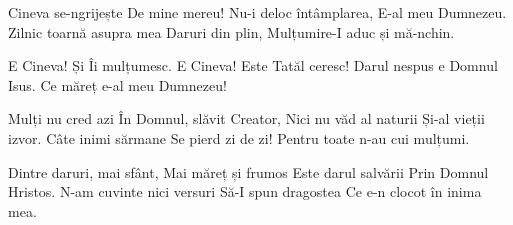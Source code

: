 \beginverse
Cineva se-ngrijește
De mine mereu!
Nu-i deloc întâmplarea,
E-al meu Dumnezeu.
Zilnic toarnă asupra mea
Daruri din plin,
Mulțumire-I aduc și mă-nchin.
\endverse

\beginchorus
E Cineva! Și Îi mulțumesc.
E Cineva! Este Tatăl ceresc!
Darul nespus e Domnul Isus.
Ce măreț e-al meu Dumnezeu!
\endchorus

\beginverse
Mulți nu cred azi
În Domnul, slăvit Creator,
Nici nu văd al naturii
Și-al vieții izvor.
Câte inimi sărmane
Se pierd zi de zi!
Pentru toate n-au cui mulțumi.
\endverse

\beginverse
Dintre daruri, mai sfânt,
Mai măreț și frumos
Este darul salvării
Prin Domnul Hristos.
N-am cuvinte nici versuri
Să-I spun dragostea
Ce e-n clocot în inima mea.
\endverse
\endsong